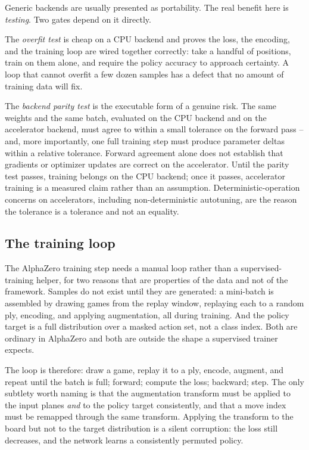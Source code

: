 Generic backends are usually presented as portability. The real benefit here is
\emph{testing}. Two gates depend on it directly.

The \emph{overfit test} is cheap on a CPU backend and proves the loss, the
encoding, and the training loop are wired together correctly: take a handful of
positions, train on them alone, and require the policy accuracy to approach
certainty. A loop that cannot overfit a few dozen samples has a defect that no
amount of training data will fix.

The \emph{backend parity test} is the executable form of a genuine risk. The same
weights and the same batch, evaluated on the CPU backend and on the accelerator
backend, must agree to within a small tolerance on the forward pass -- and, more
importantly, one full training step must produce parameter deltas within a
relative tolerance. Forward agreement alone does not establish that gradients or
optimizer updates are correct on the accelerator. Until the parity test passes,
training belongs on the CPU backend; once it passes, accelerator training is a
measured claim rather than an assumption. Deterministic-operation concerns on
accelerators, including non-deterministic autotuning, are the reason the
tolerance is a tolerance and not an equality.

\subsection{The training loop}
\label{sec:loop}

The AlphaZero training step needs a manual loop rather than a supervised-training
helper, for two reasons that are properties of the data and not of the
framework. Samples do not exist until they are generated: a mini-batch is
assembled by drawing games from the replay window, replaying each to a random
ply, encoding, and applying augmentation, all during training. And the policy
target is a full distribution over a masked action set, not a class index. Both
are ordinary in AlphaZero and both are outside the shape a supervised trainer
expects.

The loop is therefore: draw a game, replay it to a ply, encode, augment, and
repeat until the batch is full; forward; compute the loss; backward; step. The
only subtlety worth naming is that the augmentation transform must be applied to
the input planes \emph{and} to the policy target consistently, and that a move
index must be remapped through the same transform. Applying the transform to the
board but not to the target distribution is a silent corruption: the loss still
decreases, and the network learns a consistently permuted policy.

